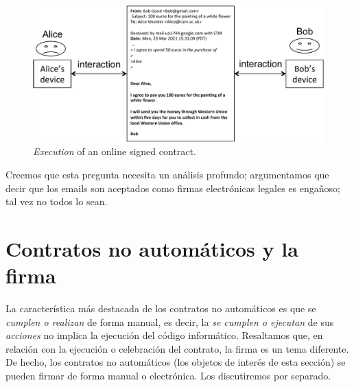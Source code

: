 \documentclass[12pt]{report} %
\begin{document}
\begin{figure}
\centering
\includegraphics[width=0.95\columnwidth]{figures/execontsignonline.pdf}
\caption{\emph{Execution} of an online signed contract.}
\label{fig:execontsignonline}
\end{figure}


Creemos que esta pregunta necesita un análisis profundo; argumentamos que decir que los emails son aceptados como firmas electrónicas legales es engañoso; tal vez no todos lo sean.

\section{ Contratos no automáticos y la firma }
\label{contnonautoma}

La característica más destacada de los contratos no automáticos es que se \emph{cumplen o realizan} de forma manual, es decir, la \emph{se cumplen o ejecutan}  de sus \emph{acciones}  no implica la ejecución del código informático. Resaltamos que, en relación con la ejecución o celebración del contrato, la firma es un tema diferente. De hecho, los contratos no automáticos (los objetos de interés de esta sección) se pueden firmar de forma manual o electrónica. Los discutiremos por separado. 
\end{document}
